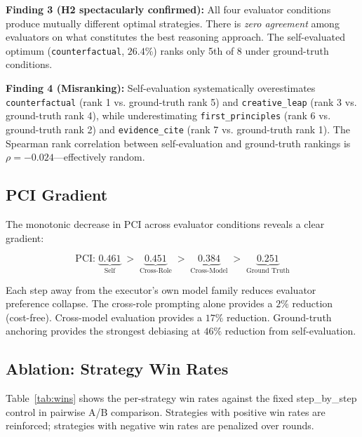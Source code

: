 \documentclass[11pt,a4paper]{article}
\begin{document}
\textbf{Finding 3 (H2 spectacularly confirmed):} All four evaluator conditions produce mutually different optimal strategies. There is \textit{zero agreement} among evaluators on what constitutes the best reasoning approach. The self-evaluated optimum (\texttt{counterfactual}, $26.4\%$) ranks only 5th of 8 under ground-truth conditions.

\textbf{Finding 4 (Misranking):} Self-evaluation systematically overestimates \texttt{counterfactual} (rank 1 vs. ground-truth rank 5) and \texttt{creative\_leap} (rank 3 vs. ground-truth rank 4), while underestimating \texttt{first\_principles} (rank 6 vs. ground-truth rank 2) and \texttt{evidence\_cite} (rank 7 vs. ground-truth rank 1). The Spearman rank correlation between self-evaluation and ground-truth rankings is $\rho = -0.024$---effectively random.

\subsection{PCI Gradient}

The monotonic decrease in PCI across evaluator conditions reveals a clear gradient:

\begin{equation}
\text{PCI: } \underbrace{0.461}_{\text{Self}} \;>\; \underbrace{0.451}_{\text{Cross-Role}} \;>\; \underbrace{0.384}_{\text{Cross-Model}} \;>\; \underbrace{0.251}_{\text{Ground Truth}}
\end{equation}

Each step away from the executor's own model family reduces evaluator preference collapse. The cross-role prompting alone provides a $2\%$ reduction (cost-free). Cross-model evaluation provides a $17\%$ reduction. Ground-truth anchoring provides the strongest debiasing at $46\%$ reduction from self-evaluation.

\subsection{Ablation: Strategy Win Rates}

Table~\ref{tab:wins} shows the per-strategy win rates against the fixed step\_by\_step control in pairwise A/B comparison. Strategies with positive win rates are reinforced; strategies with negative win rates are penalized over rounds.
\end{document}
